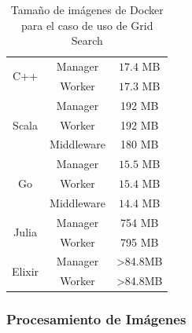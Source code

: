 \documentclass[11pt]{article}
\let\Oldsubsubsection\subsubsection
\renewcommand{\subsubsection}{\FloatBarrier\Oldsubsubsection}
\begin{document}
\begin{table}[H]
\centering
\begin{tabular}{|ccc|}
\hline
\multicolumn{1}{|c|}{\multirow{2}{*}{C++}} & \multicolumn{1}{c|}{Manager} & $17.4$ MB \\ \cline{2-3} 
\multicolumn{1}{|c|}{} & \multicolumn{1}{c|}{Worker} & $17.3$ MB \\ \hline
\multicolumn{1}{|c|}{\multirow{3}{*}{Scala}} & \multicolumn{1}{c|}{Manager} & 192 MB \\ \cline{2-3} 
\multicolumn{1}{|c|}{} & \multicolumn{1}{c|}{Worker} & 192 MB \\ \cline{2-3} 
\multicolumn{1}{|c|}{} & \multicolumn{1}{c|}{Middleware} & 180 MB \\ \hline
\multicolumn{1}{|c|}{\multirow{3}{*}{Go}} & \multicolumn{1}{c|}{Manager} & $15.5$ MB \\ \cline{2-3} 
\multicolumn{1}{|c|}{} & \multicolumn{1}{c|}{Worker} & $15.4$ MB \\ \cline{2-3} 
\multicolumn{1}{|c|}{} & \multicolumn{1}{c|}{Middleware} & $14.4$ MB \\ \hline
\multicolumn{1}{|c|}{\multirow{2}{*}{Julia}} & \multicolumn{1}{c|}{Manager} & 754 MB \\ \cline{2-3} 
\multicolumn{1}{|c|}{} & \multicolumn{1}{c|}{Worker} & 795 MB \\ \hline
\multicolumn{1}{|c|}{\multirow{2}{*}{Elixir}} & \multicolumn{1}{c|}{Manager} & \textgreater{}84.8MB \\ \cline{2-3} 
\multicolumn{1}{|c|}{} & \multicolumn{1}{c|}{Worker} & \textgreater{}84.8MB \\ \hline
\end{tabular}
\caption{Tamaño de imágenes de Docker para el caso de uso de Grid Search}
\end{table}

\subsubsection{Procesamiento de Imágenes} \label{sec:anex:metrics:ip}
\end{document}
